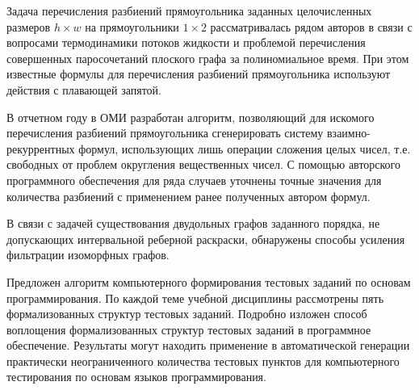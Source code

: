 \Conclusion

%



Задача перечисления разбиений прямоугольника заданных целочисленных размеров $h\times w$ на прямоугольники $1\times 2$ рассматривалась рядом авторов в связи с вопросами термодинамики потоков жидкости и проблемой перечисления совершенных паросочетаний плоского графа за полиномиальное время.
При этом известные формулы для перечисления разбиений прямоугольника используют действия с плавающей запятой. 

В отчетном году в ОМИ разработан алгоритм, позволяющий для искомого перечисления разбиений прямоугольника сгенерировать систему взаимно-рекуррентных формул, использующих лишь операции сложения целых чисел, т.е. свободных от проблем округления вещественных чисел. 
С помощью авторского программного обеспечения для ряда случаев уточнены точные значения для количества разбиений с
применением ранее полученных автором формул.


В связи с задачей существования двудольных графов заданного порядка, не допускающих интервальной реберной раскраски,
обнаружены способы усиления фильтрации изоморфных графов.




Предложен алгоритм компьютерного формирования тестовых заданий по основам программирования. 
По каждой теме учебной дисциплины рассмотрены пять формализованных структур тестовых заданий. 
Подробно изложен способ воплощения формализованных структур тестовых заданий в программное обеспечение.
Результаты могут находить применение в автоматической генерации практически неограниченного количества тестовых пунктов для компьютерного тестирования по основам языков программирования.

